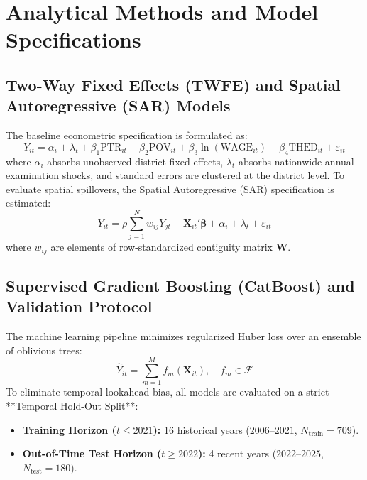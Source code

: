 \documentclass[12pt,letterpaper]{report}
\begin{document}
\section{Analytical Methods and Model Specifications}
\subsection{Two-Way Fixed Effects (TWFE) and Spatial Autoregressive (SAR) Models}
The baseline econometric specification is formulated as:
\begin{equation}
    Y_{it} = \alpha_i + \lambda_t + \beta_1 \text{PTR}_{it} + \beta_2 \text{POV}_{it} + \beta_3 \ln(\text{WAGE}_{it}) + \beta_4 \text{THED}_{it} + \varepsilon_{it}
\end{equation}
where $\alpha_i$ absorbs unobserved district fixed effects, $\lambda_t$ absorbs nationwide annual examination shocks, and standard errors are clustered at the district level. To evaluate spatial spillovers, the Spatial Autoregressive (SAR) specification is estimated:
\begin{equation}
    Y_{it} = \rho \sum_{j=1}^N w_{ij} Y_{jt} + \mathbf{X}_{it}' \boldsymbol{\beta} + \alpha_i + \lambda_t + \varepsilon_{it}
\end{equation}
where $w_{ij}$ are elements of row-standardized contiguity matrix $\mathbf{W}$.

\subsection{Supervised Gradient Boosting (CatBoost) and Validation Protocol}
The machine learning pipeline minimizes regularized Huber loss over an ensemble of oblivious trees:
\begin{equation}
    \hat{Y}_{it} = \sum_{m=1}^M f_m(\mathbf{X}_{it}), \quad f_m \in \mathcal{F}
\end{equation}
To eliminate temporal lookahead bias, all models are evaluated on a strict **Temporal Hold-Out Split**:
\begin{itemize}[noitemsep,topsep=2pt,parsep=0pt]
    \item \textbf{Training Horizon ($t \le 2021$):} 16 historical years ($2006\text{--}2021$, $N_{\text{train}} = 709$).
    \item \textbf{Out-of-Time Test Horizon ($t \ge 2022$):} 4 recent years ($2022\text{--}2025$, $N_{\text{test}} = 180$).
\end{itemize}
\end{document}
